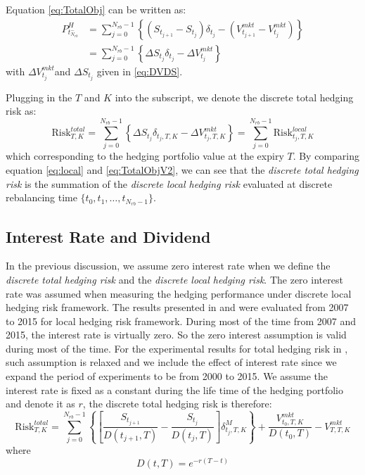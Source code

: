 \documentclass[letterpaper,12pt,titlepage,oneside,final]{book}
\numberwithin{equation}{section}
\theoremstyle{definition}
\newcommand{\DS}{\Delta S}
\newcommand{\Vmkt}{V^{mkt}}
\newcommand{\Smkt}{S}
\begin{document}
Equation \eqref{eq:TotalObj} can be written as:
\[
\begin{split}
P^H_{t_{N_{rb}}^-}&=\sum_{j=0}^{N_{rb}-1}\left\{ \left( S_{t_{j+1}}-S_{t_{j}}\right) \delta_{t_j} -(V_{t_{j+1}}^{mkt}-V_{t_j}^{mkt}) \right\}\\
&=\sum_{j=0}^{N_{rb}-1}\left\{ \DS_{t_j} \delta_{t_j} -\Delta V^{mkt}_{t_j} \right\}
\end{split}
\]
with $\Delta V^{mkt}_{t_j}$and  $\DS_{t_j}$ given in \eqref{eq:DVDS}.


Plugging in the $T$ and $K$ into the subscript, we denote the discrete total hedging risk as:
\begin{equation}
    \text{Risk}^{total}_{T,K}=\sum_{j=0}^{N_{rb}-1}\left\{ \Delta \Smkt_{t_j} \delta_{t_j,T,K} -\Delta \Vmkt_{t_j,T,K} \right\}=\sum_{j=0}^{N_{rb}-1}\text{Risk}^{local}_{t_j,T,K}
    \label{eq:TotalObjV2}
    \end{equation}
which corresponding to the hedging portfolio value at the expiry $T$. 
By comparing equation \eqref{eq:local} and \eqref{eq:TotalObjV2}, we can see that the {\em discrete total hedging risk} is the summation of the {\em discrete local hedging risk} evaluated at discrete rebalancing time $\{t_0,t_1,\dots,t_{N_{rb}-1}\}$. 
\subsection{Interest Rate and Dividend}
In the previous discussion, we assume zero interest rate  when we define the {\em discrete total hedging risk} and the {\em discrete local hedging risk}. The zero interest rate  was assumed when measuring the hedging performance under discrete local hedging risk framework. The results presented in \cite{knian2017} and \cite{knian2019} were evaluated from 2007 to 2015 for local hedging risk framework. During  most of the time from 2007 and 2015, the interest rate is virtually zero. So the zero interest assumption is valid during most of the time.  For the experimental results for total hedging risk in \cite{knian2020}, such assumption is relaxed and we include the effect of interest rate since we expand the period of experiments to be from 2000 to 2015. We assume the interest rate is fixed as a constant during the life time of the hedging portfolio and denote it as $r$, the discrete total hedging risk is therefore:
\begin{equation}
	\text{Risk}^{total}_{T,K}=\sum_{j=0}^{N_{rb}-1}\left\{ \left[\frac{\Smkt_{t_{j+1}}}{D(t_{j+1},T)}-\frac{\Smkt_{t_{j}}}{D(t_{j},T)}\right] \delta^M_{t_j,T,K} \right\}+\frac{\Vmkt_{t_0,T,K}}{D(t_{0},T)}-\Vmkt_{T,T,K}
 \label{eq:TotalObjV3}
\end{equation}
where
\[D(t,T)=e^{-r(T-t)}\]
\end{document}
